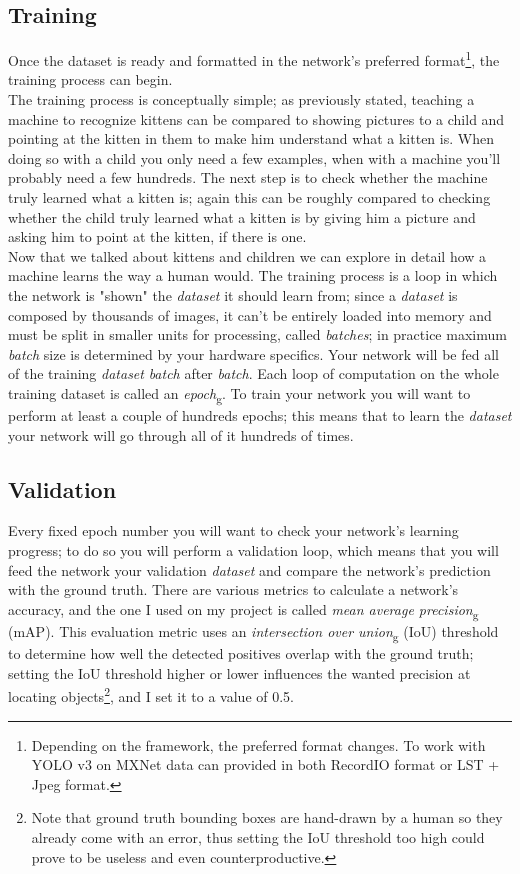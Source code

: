 	\subsection{Training}
	Once the dataset is ready and formatted in the network's preferred format\footnote{Depending on the framework, the preferred format changes. To work with YOLO v3 on MXNet data can provided in both RecordIO format or LST + Jpeg format.}, the training process can begin. \\
	The training process is conceptually simple; as previously stated, teaching a machine to recognize kittens can be compared to showing pictures to a child and pointing at the kitten in them to make him understand what a kitten is. When doing so with a child you only need a few examples, when with a machine you'll probably need a few hundreds. The next step is to check whether the machine truly learned what a kitten is; again this can be roughly compared to checking whether the child truly learned what a kitten is by giving him a picture and asking him to point at the kitten, if there is one. \\
	Now that we talked about kittens and children we can explore in detail how a machine learns the way a human would.
	The training process is a loop in which the network is "shown" the \emph{dataset} it should learn from; since a \emph{dataset} is composed by thousands of images, it can't be entirely loaded into memory and must be split in smaller units for processing, called \emph{batches}; in practice maximum \emph{batch} size is determined by your hardware specifics. Your network will be fed all of the training \emph{dataset} \emph{batch} after \emph{batch}. Each loop of computation on the whole training dataset is called an \emph{\gls{epoch}}\textsubscript{g}. To train your network you will want to perform at least a couple of hundreds epochs; this means that to learn the \emph{dataset} your network will go through all of it hundreds of times. 

	\subsection{Validation}	
	Every fixed epoch number you will want to check your network's learning progress; to do so you will perform a validation loop, which means that you will feed the network your validation \emph{dataset} and compare the network's prediction with the ground truth. There are various metrics to calculate a network's accuracy, and the one I used on my project is called \emph{\gls{mean average precision}}\textsubscript{g} (mAP). This evaluation metric uses an \emph{\gls{intersection over union}}\textsubscript{g} (IoU) threshold to determine how well the detected positives overlap with the ground truth; setting the IoU threshold higher or lower influences the wanted precision at locating objects\footnote{Note that ground truth bounding boxes are hand-drawn by a human so they already come with an error, thus setting the IoU threshold too high could prove to be useless and even counterproductive.}, and I set it to a value of 0.5.
	
